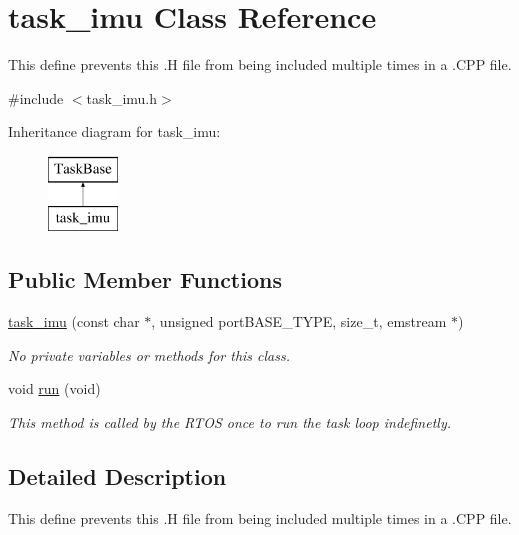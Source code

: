 \hypertarget{classtask__imu}{\section{task\-\_\-imu Class Reference}
\label{classtask__imu}
}


This define prevents this .H file from being included multiple times in a .C\-P\-P file.  




{\ttfamily \#include $<$task\-\_\-imu.\-h$>$}

Inheritance diagram for task\-\_\-imu\-:\begin{figure}[H]
\begin{center}
\leavevmode
\includegraphics[height=2.000000cm]{classtask__imu}
\end{center}
\end{figure}
\subsection*{Public Member Functions}
\begin{DoxyCompactItemize}
\item 
\hyperlink{classtask__imu_acec88f715a9e9b762b19f19eec369757}{task\-\_\-imu} (const char $\ast$, unsigned port\-B\-A\-S\-E\-\_\-\-T\-Y\-P\-E, size\-\_\-t, emstream $\ast$)
\begin{DoxyCompactList}\small\item\em No private variables or methods for this class. \end{DoxyCompactList}\item 
void \hyperlink{classtask__imu_ae05d282ee631de7e7c958b9a37c2651d}{run} (void)
\begin{DoxyCompactList}\small\item\em This method is called by the R\-T\-O\-S once to run the task loop indefinetly. \end{DoxyCompactList}\end{DoxyCompactItemize}


\subsection{Detailed Description}
This define prevents this .H file from being included multiple times in a .C\-P\-P file. 

